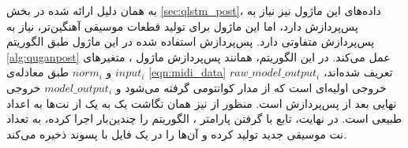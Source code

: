 به همان دلیل ارائه شده در بخش
\ref{sec:qlstm_post}،
داده‌های این ماژول نیز نیاز به پس‌پردازش دارد، اما این ماژول برای تولید قطعات موسیقی آهنگین‌تر، نیاز به پس‌پردازش متفاوتی دارد.
پس‌پردازش استفاده شده در این ماژول طبق الگوریتم
\ref{alg:quganpost}
عمل می‌کند.
در این الگوریتم، همانند پس‌پردازش ماژول
،
متغیرهای
$input_i$
و
$norm_i$
طبق معادله‌ی
\ref{eqn:midi_data}
تعریف شده‌اند،
$raw\_model\_output_i$
خروجی اولیه‌ای است که از مدار کوانتومی گرفته می‌شود و
$model\_output_i$
خروجی نهایی بعد از پس‌پردازش است.
منظور از 
نیز همان نگاشت یک به یک از نت‌ها به اعداد طبیعی است.
در نهایت، تابع
با گرفتن پارامتر
،
الگوریتم را چندین‌بار اجرا کرده، به تعداد
نت موسیقی جدید تولید کرده و آن‌ها را در یک فایل با پسوند
ذخیره می‌کند.

